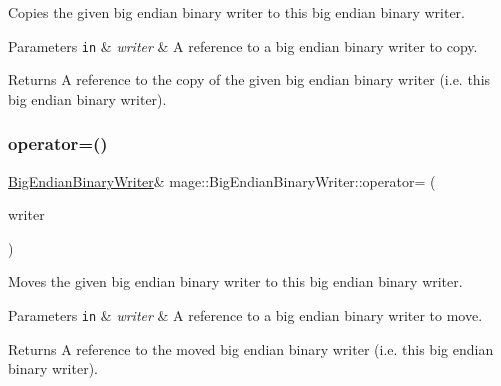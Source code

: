 Copies the given big endian binary writer to this big endian binary writer.


\begin{DoxyParams}[1]{Parameters}
\mbox{\tt in}  & {\em writer} & A reference to a big endian binary writer to copy. \\
\hline
\end{DoxyParams}
\begin{DoxyReturn}{Returns}
A reference to the copy of the given big endian binary writer (i.\+e. this big endian binary writer). 
\end{DoxyReturn}
\hypertarget{classmage_1_1_big_endian_binary_writer_a92b57976cca0ff1859a487a1fe238211}{}\label{classmage_1_1_big_endian_binary_writer_a92b57976cca0ff1859a487a1fe238211} 
\subsubsection{\texorpdfstring{operator=()}{operator=()}\hspace{0.1cm}{\footnotesize\ttfamily [2/2]}}
{\footnotesize\ttfamily \hyperlink{classmage_1_1_big_endian_binary_writer}{Big\+Endian\+Binary\+Writer}\& mage\+::\+Big\+Endian\+Binary\+Writer\+::operator= (\begin{DoxyParamCaption}\item[{\hyperlink{classmage_1_1_big_endian_binary_writer}{Big\+Endian\+Binary\+Writer} \&\&}]{writer }\end{DoxyParamCaption})\hspace{0.3cm}{\ttfamily [delete]}}

Moves the given big endian binary writer to this big endian binary writer.


\begin{DoxyParams}[1]{Parameters}
\mbox{\tt in}  & {\em writer} & A reference to a big endian binary writer to move. \\
\hline
\end{DoxyParams}
\begin{DoxyReturn}{Returns}
A reference to the moved big endian binary writer (i.\+e. this big endian binary writer). 
\end{DoxyReturn}
\hypertarget{classmage_1_1_big_endian_binary_writer_ae6ee6613e629971502324cffc944795d}{}\label{classmage_1_1_big_endian_binary_writer_ae6ee6613e629971502324cffc944795d} 
